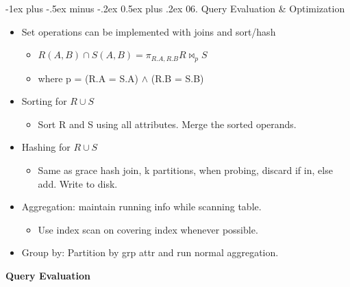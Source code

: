 \documentclass[9pt, landscape]{extarticle}
\makeatletter
\renewcommand{\section}{\@startsection{section}{1}{0mm}%
  {-1ex plus -.5ex minus -.2ex}%
  {0.5ex plus .2ex}%
{\normalfont\large\bfseries}}
\makeatother
\begin{document}
\begin{multicols*}{4}
  \section{06. Query Evaluation \& Optimization}

  \begin{itemize}
    \item Set operations can be implemented with joins and sort/hash
    \begin{itemize}
      \item $R(A, B) \cap S(A, B) = \pi_{R.A, R.B} R \bowtie_{p} S$
      \item where p = (R.A = S.A) $\wedge$ (R.B = S.B)
    \end{itemize}
    \item Sorting for $R \cup S$
    \begin{itemize}
      \item Sort R and S using all attributes. Merge the sorted operands.
    \end{itemize}
    \item Hashing for $R \cup S$
    \begin{itemize}
      \item Same as grace hash join, k partitions, when probing, discard if in, else add. Write to disk.
    \end{itemize}
    \item Aggregation: maintain running info while scanning table.
    \begin{itemize}
      \item Use index scan on covering index whenever possible.
    \end{itemize}
    \item Group by: Partition by grp attr and run normal aggregation.
  \end{itemize}

  \textbf{Query Evaluation}


\end{multicols*}
\end{document}
